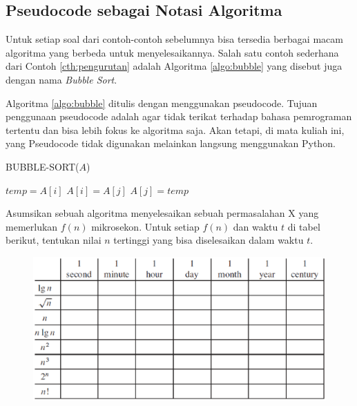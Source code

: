 \subsection{Pseudocode sebagai Notasi Algoritma}
Untuk setiap soal dari contoh-contoh sebelumnya bisa tersedia berbagai macam algoritma yang berbeda untuk menyelesaikannya. Salah satu contoh sederhana dari Contoh \ref{cth:pengurutan} adalah Algoritma \ref{algo:bubble} yang disebut juga dengan nama \textit{Bubble Sort}. 

Algoritma \ref{algo:bubble} ditulis dengan menggunakan pseudocode. Tujuan penggunaan pseudocode adalah agar tidak terikat terhadap bahasa pemrograman tertentu dan bisa lebih fokus ke algoritma saja. Akan tetapi, di mata kuliah ini, yang Pseudocode tidak digunakan melainkan langsung menggunakan Python.

\begin{algorithm}
	\caption{BUBBLE-SORT($A$)}
	\label{algo:bubble}
	\begin{algorithmic}[1]
			\STATE $temp = A[i]$
			\STATE $A[i] = A[j]$
			\STATE $A[j] = temp$
			\ENDIF
		\ENDFOR
	\ENDFOR
	\end{algorithmic}
\end{algorithm}


\begin{konsep}
Asumsikan sebuah algoritma menyelesaikan sebuah permasalahan X yang memerlukan $f(n)$ mikrosekon. Untuk setiap $f(n)$ dan waktu $t$ di tabel berikut, tentukan nilai $n$ tertinggi yang bisa diselesaikan dalam waktu $t$.
\begin{figure}%
\centering
\includegraphics[scale=0.5]{fig/tableEksekusi.eps}%
\end{figure}
\end{konsep}
\newpage
